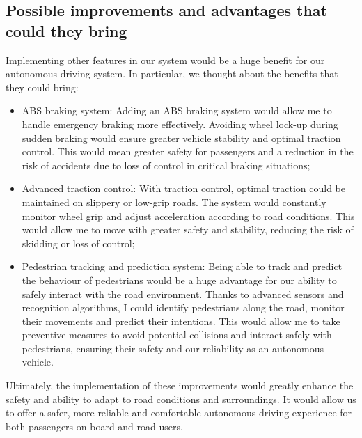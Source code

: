 \documentclass{article}
\begin{document}
\subsection{Possible improvements and advantages that could they bring}
Implementing other features in our system would be a huge benefit for our autonomous driving system. 
In particular, we thought about the benefits that they could bring:
\begin{itemize}
    \item ABS braking system: Adding an ABS braking system would allow me to handle emergency braking more effectively. Avoiding wheel lock-up during sudden braking would ensure greater vehicle stability and optimal traction control. This would mean greater safety for passengers and a reduction in the risk of accidents due to loss of control in critical braking situations;
    \item Advanced traction control: With traction control, optimal traction could be maintained on slippery or low-grip roads. The system would constantly monitor wheel grip and adjust acceleration according to road conditions. This would allow me to move with greater safety and stability, reducing the risk of skidding or loss of control;
    \item Pedestrian tracking and prediction system: Being able to track and predict the behaviour of pedestrians would be a huge advantage for our ability to safely interact with the road environment. Thanks to advanced sensors and recognition algorithms, I could identify pedestrians along the road, monitor their movements and predict their intentions. This would allow me to take preventive measures to avoid potential collisions and interact safely with pedestrians, ensuring their safety and our reliability as an autonomous vehicle.
\end{itemize}
Ultimately, the implementation of these improvements would greatly enhance the safety and ability to adapt to 
road conditions and surroundings. It would allow us to offer a safer, more reliable and comfortable autonomous 
driving experience for both passengers on board and road users.

\printbibliography
\end{document}
